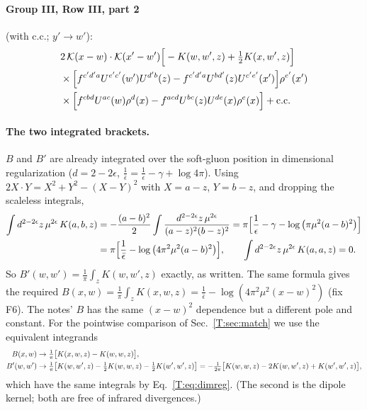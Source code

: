 \documentclass[10pt]{article}
\numberwithin{equation}{section}
\newcommand{\KK}{\mathcal K}
\begin{document}
\paragraph{Group III, Row III, part 2} (with c.c.; $y'\to w'$):
\begin{align}
&2\,\KK(x-w)\cdot\KK(x'-w')\Big[-K(w,w',z)+\tfrac12K(x,w',z)\Big]\notag\\
&\times\Big[f^{c'd'a}U^{e'c'}(w')U^{d'b}(z)-f^{c'd'a}U^{bd'}(z)U^{c'e'}(x')\Big]\rho^{e'}(x')\notag\\
&\times\Big[f^{cbd}U^{ac}(w)\rho^d(x)-f^{acd}U^{bc}(z)U^{de}(x)\rho^e(x)\Big]+{\rm c.c.}
\end{align}

\paragraph{The two integrated brackets.} $B$ and $B'$ are already integrated over the soft-gluon position in dimensional regularization ($d=2-2\epsilon$, $\frac1{\bar\epsilon}=\frac1\epsilon-\gamma+\log4\pi$). Using $2X\cdot Y=X^2+Y^2-(X-Y)^2$ with $X=a-z$, $Y=b-z$, and dropping the scaleless integrals,
\begin{align}
\int d^{2-2\epsilon}z\,\mu^{2\epsilon}\,K(a,b,z)&=-\frac{(a-b)^2}{2}\int\frac{d^{2-2\epsilon}z\,\mu^{2\epsilon}}{(a-z)^2(b-z)^2}=\pi\Big[\frac1\epsilon-\gamma-\log\big(\pi\mu^2(a-b)^2\big)\Big]\notag\\
&=\pi\Big[\frac1{\bar\epsilon}-\log\big(4\pi^2\mu^2(a-b)^2\big)\Big],\qquad\int d^{2-2\epsilon}z\,\mu^{2\epsilon}\,K(a,a,z)=0.
\label{T:eq:dimreg}
\end{align}
So $B'(w,w')=\frac1\pi\int_zK(w,w',z)$ exactly, as written. The same formula gives the required $B(x,w)=\frac1\pi\int_zK(x,w,z)=\frac1{\bar\epsilon}-\log(4\pi^2\mu^2(x-w)^2)$ (fix F6). The notes' $B$ has the same $(x-w)^2$ dependence but a different pole and constant. For the pointwise comparison of Sec.~\ref{T:sec:match} we use the equivalent integrands
\begin{align}
B(x,w)&\to\tfrac1\pi\big[K(x,w,z)-K(w,w,z)\big],\notag\\
B'(w,w')&\to\tfrac1\pi\big[K(w,w',z)-\tfrac12K(w,w,z)-\tfrac12K(w',w',z)\big]=-\tfrac1{2\pi}\big[K(w,w,z)-2K(w,w',z)+K(w',w',z)\big],
\end{align}
which have the same integrals by Eq.~\eqref{T:eq:dimreg}. (The second is the dipole kernel; both are free of infrared divergences.)
\end{document}
